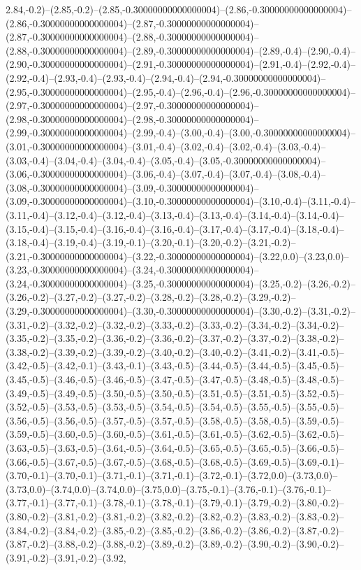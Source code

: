 2.84,-0.2)--(2.85,-0.2)--(2.85,-0.30000000000000004)--(2.86,-0.30000000000000004)--(2.86,-0.30000000000000004)--(2.87,-0.30000000000000004)--(2.87,-0.30000000000000004)--(2.88,-0.30000000000000004)--(2.88,-0.30000000000000004)--(2.89,-0.30000000000000004)--(2.89,-0.4)--(2.90,-0.4)--(2.90,-0.30000000000000004)--(2.91,-0.30000000000000004)--(2.91,-0.4)--(2.92,-0.4)--(2.92,-0.4)--(2.93,-0.4)--(2.93,-0.4)--(2.94,-0.4)--(2.94,-0.30000000000000004)--(2.95,-0.30000000000000004)--(2.95,-0.4)--(2.96,-0.4)--(2.96,-0.30000000000000004)--(2.97,-0.30000000000000004)--(2.97,-0.30000000000000004)--(2.98,-0.30000000000000004)--(2.98,-0.30000000000000004)--(2.99,-0.30000000000000004)--(2.99,-0.4)--(3.00,-0.4)--(3.00,-0.30000000000000004)--(3.01,-0.30000000000000004)--(3.01,-0.4)--(3.02,-0.4)--(3.02,-0.4)--(3.03,-0.4)--(3.03,-0.4)--(3.04,-0.4)--(3.04,-0.4)--(3.05,-0.4)--(3.05,-0.30000000000000004)--(3.06,-0.30000000000000004)--(3.06,-0.4)--(3.07,-0.4)--(3.07,-0.4)--(3.08,-0.4)--(3.08,-0.30000000000000004)--(3.09,-0.30000000000000004)--(3.09,-0.30000000000000004)--(3.10,-0.30000000000000004)--(3.10,-0.4)--(3.11,-0.4)--(3.11,-0.4)--(3.12,-0.4)--(3.12,-0.4)--(3.13,-0.4)--(3.13,-0.4)--(3.14,-0.4)--(3.14,-0.4)--(3.15,-0.4)--(3.15,-0.4)--(3.16,-0.4)--(3.16,-0.4)--(3.17,-0.4)--(3.17,-0.4)--(3.18,-0.4)--(3.18,-0.4)--(3.19,-0.4)--(3.19,-0.1)--(3.20,-0.1)--(3.20,-0.2)--(3.21,-0.2)--(3.21,-0.30000000000000004)--(3.22,-0.30000000000000004)--(3.22,0.0)--(3.23,0.0)--(3.23,-0.30000000000000004)--(3.24,-0.30000000000000004)--(3.24,-0.30000000000000004)--(3.25,-0.30000000000000004)--(3.25,-0.2)--(3.26,-0.2)--(3.26,-0.2)--(3.27,-0.2)--(3.27,-0.2)--(3.28,-0.2)--(3.28,-0.2)--(3.29,-0.2)--(3.29,-0.30000000000000004)--(3.30,-0.30000000000000004)--(3.30,-0.2)--(3.31,-0.2)--(3.31,-0.2)--(3.32,-0.2)--(3.32,-0.2)--(3.33,-0.2)--(3.33,-0.2)--(3.34,-0.2)--(3.34,-0.2)--(3.35,-0.2)--(3.35,-0.2)--(3.36,-0.2)--(3.36,-0.2)--(3.37,-0.2)--(3.37,-0.2)--(3.38,-0.2)--(3.38,-0.2)--(3.39,-0.2)--(3.39,-0.2)--(3.40,-0.2)--(3.40,-0.2)--(3.41,-0.2)--(3.41,-0.5)--(3.42,-0.5)--(3.42,-0.1)--(3.43,-0.1)--(3.43,-0.5)--(3.44,-0.5)--(3.44,-0.5)--(3.45,-0.5)--(3.45,-0.5)--(3.46,-0.5)--(3.46,-0.5)--(3.47,-0.5)--(3.47,-0.5)--(3.48,-0.5)--(3.48,-0.5)--(3.49,-0.5)--(3.49,-0.5)--(3.50,-0.5)--(3.50,-0.5)--(3.51,-0.5)--(3.51,-0.5)--(3.52,-0.5)--(3.52,-0.5)--(3.53,-0.5)--(3.53,-0.5)--(3.54,-0.5)--(3.54,-0.5)--(3.55,-0.5)--(3.55,-0.5)--(3.56,-0.5)--(3.56,-0.5)--(3.57,-0.5)--(3.57,-0.5)--(3.58,-0.5)--(3.58,-0.5)--(3.59,-0.5)--(3.59,-0.5)--(3.60,-0.5)--(3.60,-0.5)--(3.61,-0.5)--(3.61,-0.5)--(3.62,-0.5)--(3.62,-0.5)--(3.63,-0.5)--(3.63,-0.5)--(3.64,-0.5)--(3.64,-0.5)--(3.65,-0.5)--(3.65,-0.5)--(3.66,-0.5)--(3.66,-0.5)--(3.67,-0.5)--(3.67,-0.5)--(3.68,-0.5)--(3.68,-0.5)--(3.69,-0.5)--(3.69,-0.1)--(3.70,-0.1)--(3.70,-0.1)--(3.71,-0.1)--(3.71,-0.1)--(3.72,-0.1)--(3.72,0.0)--(3.73,0.0)--(3.73,0.0)--(3.74,0.0)--(3.74,0.0)--(3.75,0.0)--(3.75,-0.1)--(3.76,-0.1)--(3.76,-0.1)--(3.77,-0.1)--(3.77,-0.1)--(3.78,-0.1)--(3.78,-0.1)--(3.79,-0.1)--(3.79,-0.2)--(3.80,-0.2)--(3.80,-0.2)--(3.81,-0.2)--(3.81,-0.2)--(3.82,-0.2)--(3.82,-0.2)--(3.83,-0.2)--(3.83,-0.2)--(3.84,-0.2)--(3.84,-0.2)--(3.85,-0.2)--(3.85,-0.2)--(3.86,-0.2)--(3.86,-0.2)--(3.87,-0.2)--(3.87,-0.2)--(3.88,-0.2)--(3.88,-0.2)--(3.89,-0.2)--(3.89,-0.2)--(3.90,-0.2)--(3.90,-0.2)--(3.91,-0.2)--(3.91,-0.2)--(3.92,